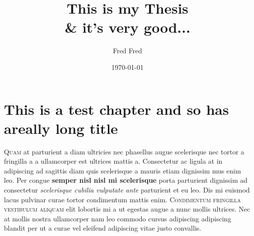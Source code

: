 \documentclass{fsthesis}
\begin{document}
\frontmatter
\title{This is my Thesis\\ \& it's very good...}
\author{Fred Fred}				%
\date{\today}%
\maketitle

\tableofcontents

\mainmatter


\chapter[Testing chapter]{This is a test chapter and so has areally long title}

\typeout{****}
\typeout{****}

\lettrine{Q}{uam} at parturient a diam ultricies nec phasellus augue scelerisque nec tortor a fringilla a a ullamcorper est ultrices mattis a. Consectetur ac ligula at in adipiscing ad sagittis diam quis scelerisque a mauris etiam dignissim mus enim leo. Per congue \textbf{semper nisl nisl mi scelerisque} porta parturient dignissim ad consectetur \textit{scelerisque cubilia vulputate ante} parturient et eu leo. \textsf{Dis mi euismod lacus pulvinar} curae tortor condimentum mattis enim. \textsc{Condimentum fringilla vestibulum aliquam} elit lobortis mi a ut egestas augue a nunc mollis ultrices. Nec at mollis nostra ullamcorper nam leo commodo cursus adipiscing adipiscing blandit per ut a curae vel eleifend adipiscing vitae justo convallis.
\end{document}
